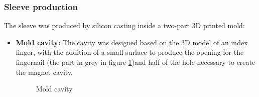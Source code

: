 \subsubsection{Sleeve production}
The sleeve was produced by silicon casting inside a two-part 3D printed mold:
\begin{itemize}
    \item \textbf{Mold cavity: } The cavity was designed based on the 3D model of an index finger, with the addition of a small surface to produce the opening for the fingernail (the part in grey in figure \ref{fig: mold_cavity})and half of the hole necessary to create the magnet cavity.
    \begin{figure}
        \centering
        \caption{Mold cavity}
        \label{fig: mold_cavity}
    \end{figure}


\end{itemize}
